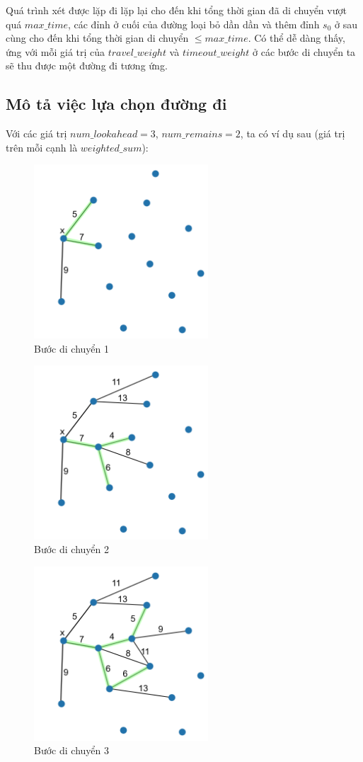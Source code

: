 \documentclass[12pt]{report}
\begin{document}
Quá trình xét được lặp đi lặp lại cho đến khi tổng thời gian đã di chuyển vượt quá $max\_time$, các đỉnh ở cuối của đường loại bỏ dần dần và thêm đỉnh $s_0$ ở sau cùng cho đến khi tổng thời gian di chuyển $ \leq max\_time$. Có thể dễ dàng thấy, ứng với mỗi giá trị của $travel\_weight$ và $timeout\_weight$ ở các bước di chuyển ta sẽ thu được một đường đi tương ứng. 

\subsection{Mô tả việc lựa chọn đường đi}
Với các giá trị $num\_lookahead = 3$, $num\_remains = 2$, ta có ví dụ sau (giá trị trên mỗi cạnh là $weighted\_sum$): 

\begin{figure}[H]
\caption{Bước di chuyển 1}
\centering
\includegraphics[width=6.5cm]{step-1.png}
\end{figure}

\begin{figure}[H]
\caption{Bước di chuyển 2}
\centering
\includegraphics[width=6.5cm]{step-2.png}
\end{figure}

\begin{figure}[H]
\caption{Bước di chuyển 3}
\centering
\includegraphics[width=6.5cm]{step-3.png}
\end{figure}
\end{document}
